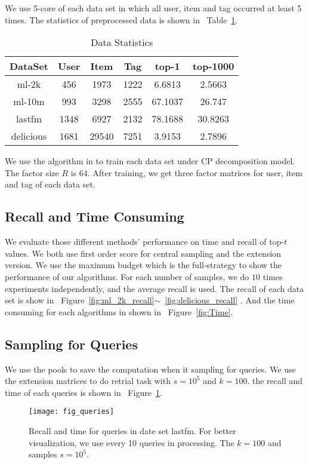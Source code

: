 \documentclass[letterpaper]{article}
\newcommand{\Fig}[1]   {Figure~\ref{fig:#1}}
\newcommand{\Figs}[2]  {Figure~\ref{fig:#1}$\sim$~\ref{fig:#2}}
\newcommand{\Table}[1] {Table~\ref{table:#1}}
\begin{document}
We use 5-core of each data set in which all user, item and tag occurred at least 5 times.
The statistics of preprocessed data is shown in ~\Table{Data}.
\begin{table}[ht]
  \label{table:Data}
  \centering
  \begin{tabular}{|c|c|c|c|c|c|}
    \hline
    DataSet     & User & Item    & Tag    & top-1   & top-1000\\
    \hline
    ml-2k       & 456  &  1973   &  1222  & 6.6813  & 2.5663 \\
    ml-10m      & 993  &  3298   &  2555  & 67.1037 & 26.747 \\
    lastfm      & 1348 &  6927   &  2132  & 78.1688 & 30.8263\\
    delicious   & 1681 &  29540  &  7251  & 3.9153  & 2.7896 \\
    \hline
  \end{tabular}
  \caption{Data Statistics}
\end{table}
We use the algorithm in \cite{Rendle_RTF} to train each data set under CP decomposition model.
The factor size $R$ is $64$.
After training, we get three factor matrices for user, item and tag of each data set.

\subsection{Recall and Time Consuming}
We evaluate those different methods' performance on time and recall of top-$t$ values.
We both use first order score for central sampling and the extension version.
We use the maximum budget which is the full-strategy to show the performance of our algorithms.
For each number of samples, we do $10$ times experiments independently, and the average recall is used.
The recall of each data set is show in ~\Figs{ml_2k_recall}{delicious_recall} .
And the time consuming for each algorithms in shown in ~\Fig{Time}.



\subsection{Sampling for Queries}
We use the pools to save the computation when it sampling for queries.
We use the extension matrices to do retrial task with $s=10^5$ and $k=100$.
the recall and time of each queries is shown in ~\Fig{Queries}.
\begin{figure}[ht]
  \centering
  \texttt{[image: fig\_queries]}\\
  \caption{Recall and time for queries in date set lastfm.
           For better visualization,
           we use every 10 queries in processing.
           The $k=100$ and samples $s=10^5$.}
  \label{fig:Queries}
\end{figure}
\end{document}
